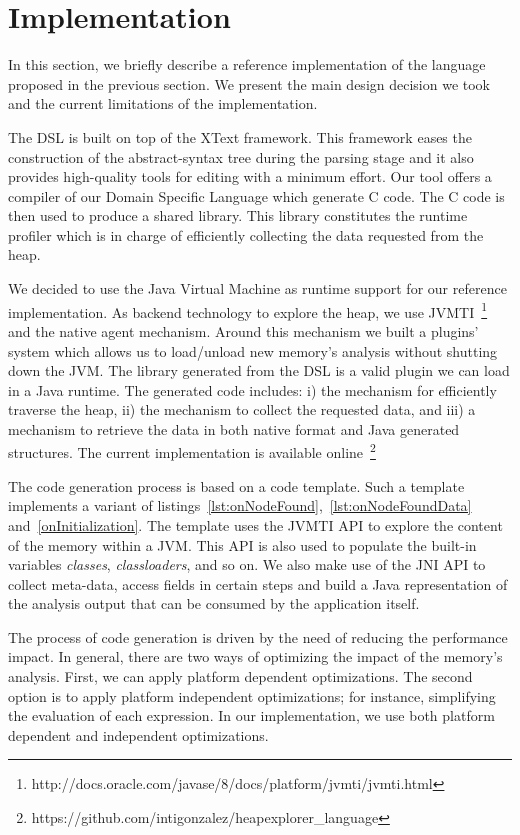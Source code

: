 \section{Implementation}\label{sec:implementation}

In this section, we briefly describe a reference implementation of the language proposed in the previous section. We present the main design decision we took and the current limitations of the implementation.

The DSL is built on top of the XText framework.
This framework eases the construction of the abstract-syntax tree during the parsing stage and it also provides high-quality tools for editing with a minimum effort.
Our tool offers a compiler of our Domain Specific Language which generate C code.
The C code is then used to produce a shared library.
This library constitutes the runtime profiler which is in charge of efficiently collecting the data requested from the heap.

We decided to use the Java Virtual Machine as runtime support for our reference implementation.
As backend technology to explore the heap, we use JVMTI~\footnote{http://docs.oracle.com/javase/8/docs/platform/jvmti/jvmti.html} and the native agent mechanism.
Around this mechanism we built a plugins' system which allows us to load/unload new memory's analysis without shutting down the JVM.
The library generated from the DSL is a valid plugin we can load in a Java runtime.
The generated code includes: i) the mechanism for efficiently traverse the heap, ii) the mechanism to collect the requested data, and iii) a mechanism to retrieve the data in both native format and Java generated structures. The current implementation is available online~\footnote{https://github.com/intigonzalez/heapexplorer\_language}

The code generation process is based on a code template.
Such a template implements a variant of listings~\ref{lst:onNodeFound},~\ref{lst:onNodeFoundData} and~\ref{onInitialization}.
The template uses the JVMTI API to explore the content of the memory within a JVM.
This API is also used to populate the built-in variables \textit{classes}, \textit{classloaders}, and so on.
We also make use of the JNI API to collect meta-data, access fields in certain steps and build a Java representation of the analysis output that can be consumed by the application itself.

The process of code generation is driven by the need of reducing the performance impact.
In general, there are two ways of optimizing the impact of the memory's analysis.
First, we can apply platform dependent optimizations.
The second option is to apply platform independent optimizations; for instance, simplifying the evaluation of each expression.
In our implementation, we use both platform dependent and independent optimizations.

